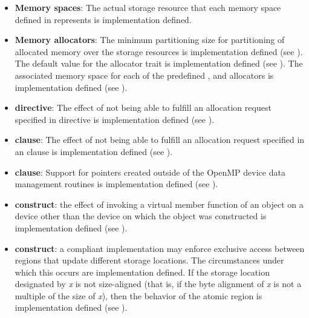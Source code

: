 \begin{itemize}
\item \textbf{Memory spaces}: The actual storage resource that each memory 
      space defined in  represents is 
      implementation defined.
\item \textbf{Memory allocators}: The minimum partitioning size for partitioning 
      of allocated memory over the storage resources is implementation defined 
      (see ). The default value for the 
       allocator trait is implementation defined (see 
      ). The associated memory space for each of 
      the predefined ,  
      and  allocators is implementation defined 
      (see ).
\item {} \textbf{directive}: The effect of not being able to 
      fulfill an allocation request specified in  directive 
      is implementation defined (see ).
\item {} \textbf{clause}: The effect of not being able to fulfill 
      an allocation request specified in an  clause is 
      implementation defined (see ).
\item {} \textbf{clause}: Support for pointers created outside 
      of the OpenMP device data management routines is implementation defined 
      (see ).
\item {} \textbf{construct}: the effect of invoking a virtual member
      function of an object on a device other than the device on which the object 
      was constructed is implementation defined (see 
      ).
\item {} \textbf{construct}: a compliant implementation may enforce 
      exclusive access 
      between  regions that update different storage locations. 
      The circumstances under which this occurs are implementation defined. 
      If the storage location designated by \emph{x} is not size-aligned (that 
      is, if the byte alignment of \emph{x} is not a multiple of the size of 
      \emph{x}), then the behavior of the atomic region is implementation 
      defined (see ).


\end{itemize}
